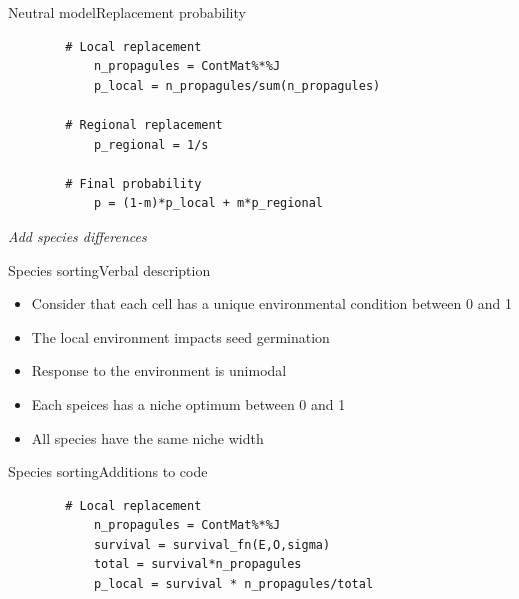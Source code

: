 \documentclass[10pt,aspectratio=149]{beamer}
\begin{document}

\begin{frame}[fragile]{Neutral model}{Replacement probability}

    \begin{verbatim}
        # Local replacement 
            n_propagules = ContMat%*%J
            p_local = n_propagules/sum(n_propagules)

        # Regional replacement 
            p_regional = 1/s

        # Final probability
            p = (1-m)*p_local + m*p_regional
    \end{verbatim}

\end{frame}


{
\usebackgroundtemplate{}
\begin{frame}

	\pagecolor{BDQC1st}
	\color{white}

	\LARGE{\textit{Add species differences}}

\end{frame}
}


\begin{frame}{Species sorting}{Verbal description}

    \begin{itemize}
        \item Consider that each cell has a unique environmental condition between 0 and 1
        \item The local environment impacts seed germination 
        \item Response to the environment is unimodal
        \item Each speices has a niche optimum between 0 and 1
        \item All species have the same niche width
    \end{itemize}

\end{frame}


\begin{frame}[fragile]{Species sorting}{Additions to code}

    \begin{verbatim}
        # Local replacement 
            n_propagules = ContMat%*%J
            survival = survival_fn(E,O,sigma)
            total = survival*n_propagules
            p_local = survival * n_propagules/total
    \end{verbatim}

\end{frame}
\end{document}
